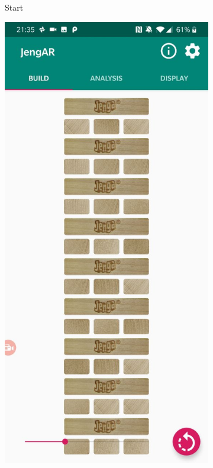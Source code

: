 \begin{figure}[ht]
\begin{subfigure}{0.22\textwidth}
\caption{Start} \label{fig:buildstart}
\end{subfigure}
\hspace*{\fill}
\begin{subfigure}{0.22\textwidth}
\includegraphics[width=\linewidth]{images/implementation/build-zoom}

\end{subfigure}
\end{figure}

